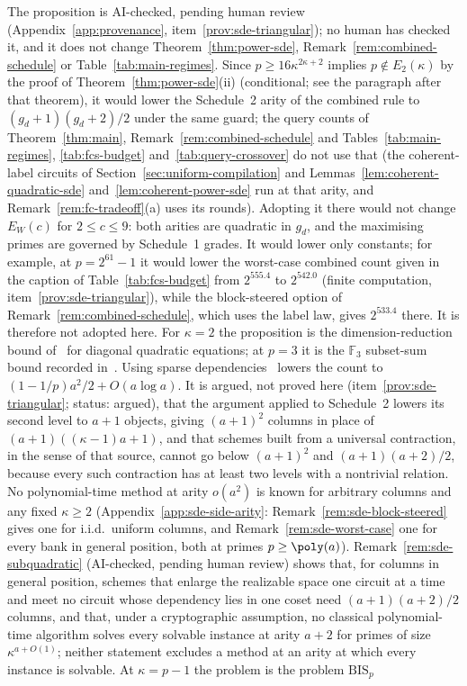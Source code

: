 \begin{remark}
\label{rem:triangular-scope}
The proposition is AI-checked, pending human review (Appendix~\ref{app:provenance}, item~\ref{prov:sde-triangular}); no human has checked it, and it does not change Theorem~\ref{thm:power-sde}, Remark~\ref{rem:combined-schedule} or Table~\ref{tab:main-regimes}. Since $p \ge 16\kappa^{2\kappa+2}$ implies $p \notin E_2(\kappa)$ by the proof of Theorem~\ref{thm:power-sde}(ii) (conditional; see the paragraph after that theorem), it would lower the Schedule~2 arity of the combined rule to $(g_d+1)(g_d+2)/2$ under the same guard; the query counts of Theorem~\ref{thm:main}, Remark~\ref{rem:combined-schedule} and Tables~\ref{tab:main-regimes}, \ref{tab:fcs-budget} and~\ref{tab:query-crossover} do not use that (the coherent-label circuits of Section~\ref{sec:uniform-compilation} and Lemmas~\ref{lem:coherent-quadratic-sde} and~\ref{lem:coherent-power-sde} run at that arity, and Remark~\ref{rem:fc-tradeoff}(a) uses its rounds). Adopting it there would not change $E_W(c)$ for $2\le c\le 9$: both arities are quadratic in $g_d$, and the maximising primes are governed by Schedule~1 grades. It would lower only constants; for example, at $p=2^{61}-1$ it would lower the worst-case combined count given in the caption of Table~\ref{tab:fcs-budget} from $2^{555.4}$ to $2^{542.0}$ (finite computation, item~\ref{prov:sde-triangular}), while the block-steered option of Remark~\ref{rem:combined-schedule}, which uses the label law, gives $2^{533.4}$ there. It is therefore not adopted here. For $\kappa=2$ the proposition is the dimension-reduction bound of~\cite[Claim~1]{IvanyosSanselmeSantha2012} for diagonal quadratic equations; at $p=3$ it is the $\mathbb{F}_3$ subset-sum bound recorded in~\cite[Theorem~2.2]{KothariODonnellWu2026}. Using sparse dependencies~\cite[Lemma~3.6]{KothariODonnellWu2026} lowers the count to $(1-1/p)a^2/2+O(a\log a)$. It is argued, not proved here (item~\ref{prov:sde-triangular}; status: argued), that the argument applied to Schedule~2 lowers its second level to $a+1$ objects, giving $(a+1)^2$ columns in place of $(a+1)((\kappa-1)a+1)$, and that schemes built from a universal contraction, in the sense of that source, cannot go below $(a+1)^2$ and $(a+1)(a+2)/2$, because every such contraction has at least two levels with a nontrivial relation. No polynomial-time method at arity $o(a^2)$ is known for arbitrary columns and any fixed $\kappa\ge2$ (Appendix~\ref{app:sde-side-arity}: Remark~\ref{rem:sde-block-steered} gives one for i.i.d.\ uniform columns, and Remark~\ref{rem:sde-worst-case} one for every bank in general position, both at primes $p \ge \poly(a)$). Remark~\ref{rem:sde-subquadratic} (AI-checked, pending human review) shows that, for columns in general position, schemes that enlarge the realizable space one circuit at a time and meet no circuit whose dependency lies in one coset need $(a+1)(a+2)/2$ columns, and that, under a cryptographic assumption, no classical polynomial-time algorithm solves every solvable instance at arity $a+2$ for primes of size $\kappa^{a+O(1)}$; neither statement excludes a method at an arity at which every instance is solvable. At $\kappa=p-1$ the problem is the problem $\mathrm{BIS}_p$ 
\end{remark}
